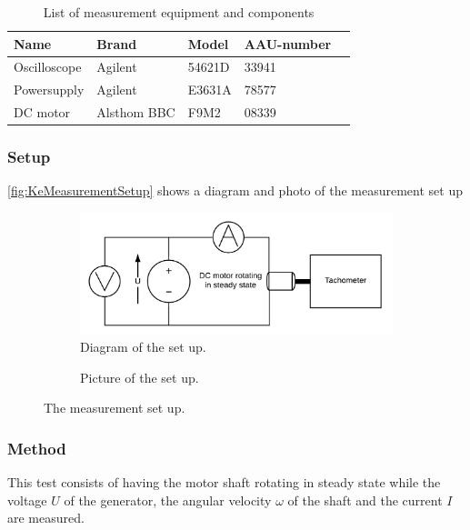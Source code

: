 \begin{table}[htbp]
	\centering
	\caption{List of measurement equipment and components}\label{tab_appendix:KeSetUp}
	
	\begin{tabularx}{\textwidth}{lXXXX}
		Name 				& Brand	& Model & AAU-number									\\ \toprule \rowcolor{lightGrey}
		Oscilloscope	& Agilent & 54621D & 33941 	\\
		Powersupply	& Agilent & E3631A & 78577\\ \rowcolor{lightGrey}
		DC motor & Alsthom BBC & F9M2& 08339
	\end{tabularx}
\end{table}

\subsubsection*{Setup}
\autoref{fig:KeMeasurementSetup} shows a diagram and photo of the measurement set up
\begin{figure}[htbp]
	\centering
	\begin{subfigure}{0.50\textwidth}
		\includegraphics[width=\textwidth]{figures/appendix/Motor&GearTests/KeTestSetUp}
		\caption{Diagram of the set up.} \label{fig:KeMeasurementDiagram}
	\end{subfigure}
	\begin{subfigure}{0.40\textwidth}
		\caption{Picture of the set up.} \label{fig:KeMeasurementPictures}
	\end{subfigure}
	\caption{The measurement set up.} \label{fig:KeMeasurementSetup}   
\end{figure}

\subsubsection*{Method}
This test consists of having the motor shaft rotating in steady state while the voltage $U$ of the generator, the angular velocity $\omega$ of the shaft and the current $I$ are measured.
\newpage


